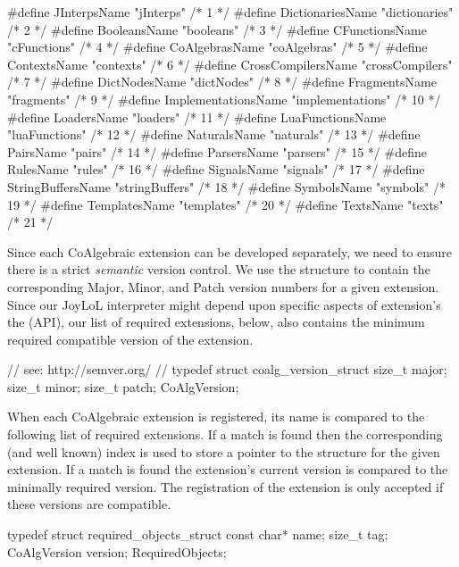 #define JInterpsName        "jInterps"        /*  1 */
#define DictionariesName    "dictionaries"    /*  2 */
#define BooleansName        "booleans"        /*  3 */
#define CFunctionsName      "cFunctions"      /*  4 */
#define CoAlgebrasName      "coAlgebras"      /*  5 */
#define ContextsName        "contexts"        /*  6 */
#define CrossCompilersName  "crossCompilers"  /*  7 */
#define DictNodesName       "dictNodes"       /*  8 */
#define FragmentsName       "fragments"       /*  9 */
#define ImplementationsName "implementations" /* 10 */
#define LoadersName         "loaders"         /* 11 */
#define LuaFunctionsName    "luaFunctions"    /* 12 */
#define NaturalsName        "naturals"        /* 13 */
#define PairsName           "pairs"           /* 14 */
#define ParsersName         "parsers"         /* 15 */
#define RulesName           "rules"           /* 16 */
#define SignalsName         "signals"         /* 17 */
#define StringBuffersName   "stringBuffers"   /* 18 */
#define SymbolsName         "symbols"         /* 19 */
#define TemplatesName       "templates"       /* 20 */
#define TextsName           "texts"           /* 21 */
\stopCHeader

Since each CoAlgebraic extension can be developed separately, we need to 
ensure there is a strict \emph{semantic} version control. We use the 
 structure to contain the corresponding Major, Minor, 
and Patch version numbers for a given extension. Since our JoyLoL 
interpreter might depend upon specific aspects of extension's the 
 (API), our list of required 
extensions, below, also contains the minimum required compatible version 
of the extension. 

\startCHeader
// see: http://semver.org/
//
typedef struct coalg_version_struct {
  size_t major;
  size_t minor;
  size_t patch;
} CoAlgVersion;
\stopCHeader

When each CoAlgebraic extension is registered, its name is compared to the 
following list of required extensions. If a match is found then the 
corresponding (and well known) index is used to store a pointer to the 
 structure for the given extension. If a match is found 
the extension's current version is compared to the minimally required 
version. The registration of the extension is only accepted if these 
versions are compatible. 

\startCHeader
typedef struct required_objects_struct {
  const char*  name;
  size_t       tag;
  CoAlgVersion version;
} RequiredObjects;

